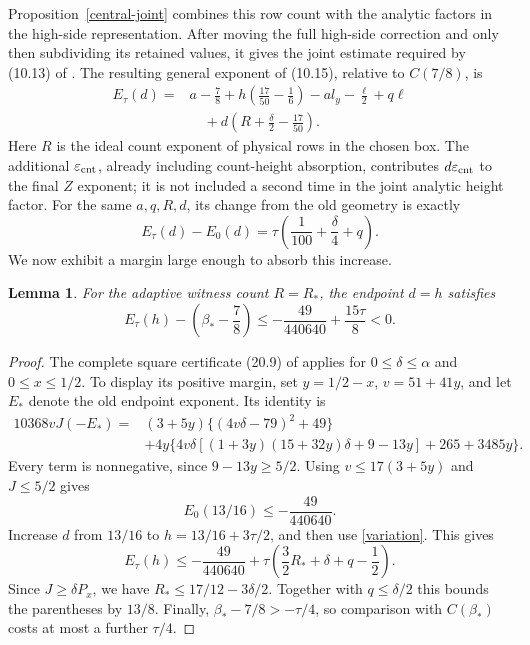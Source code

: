 \documentclass[10pt,reqno,a4paper]{amsart}
\newtheorem{lemma}[theorem]{Lemma}
\theoremstyle{remark}
\newcommand{\eps}{\varepsilon}
\newcommand{\bp}{\beta_*}
\begin{document}
Proposition~\ref{central-joint} combines this row count with the
analytic factors in the high-side representation. After moving the full high-side
correction and only then subdividing its retained values, it gives
the joint estimate required by (10.13) of \cite{q30}. The resulting
general exponent of (10.15), relative to $C(7/8)$, is
\begin{equation}\label{high-exponent}
\begin{aligned}
 E_\tau(d)={}&a-\frac78
       +h\left(\frac{17}{50}-\frac16\right)
       -al_y-\frac\ell2+q\ell\\
      &\quad+d\left(R+\frac\delta2-\frac{17}{50}\right).
\end{aligned}
\end{equation}
Here $R$ is the ideal count exponent of physical rows in the chosen
box. The additional $\eps_{\rm cnt}$, already including count-height
absorption, contributes $d\eps_{\rm cnt}$ to the final $Z$ exponent;
it is not included a second time in the joint analytic height factor.
For the same $a,q,R,d$, its change from the old geometry is exactly
\begin{equation}\label{variation}
       E_\tau(d)-E_0(d)
         =\tau\left(\frac1{100}+\frac\delta4+q\right).
\end{equation}
We now exhibit a margin large enough to absorb this increase.

\begin{lemma}\label{endpoint}
For the adaptive witness count $R=R_*$, the endpoint $d=h$ satisfies
\[
 E_\tau(h)-\left(\bp-\frac78\right)
          \le-\frac{49}{440640}+\frac{15\tau}{8}<0.
\]
\end{lemma}

\begin{proof}
The complete square certificate (20.9) of \cite{q30} applies for
$0\le\delta\le\alpha$ and $0\le x\le1/2$. To display its positive
margin, set $y=1/2-x$, $v=51+41y$, and let $E_*$ denote the old
endpoint exponent. Its identity is
\begin{align*}
 10368vJ(-E_*)={}&(3+5y)\bigl\{(4v\delta-79)^2+49\bigr\}\\
 &+4y\bigl\{4v\delta[
       (1+3y)(15+32y)\delta+9-13y]+265+3485y\bigr\}.
\end{align*}
Every term is nonnegative, since $9-13y\ge5/2$. Using
$v\le17(3+5y)$ and $J\le5/2$ gives
\[
                         E_0(13/16)\le-\frac{49}{440640}.
\]
Increase $d$ from $13/16$ to $h=13/16+3\tau/2$, and then use
\eqref{variation}. This gives
\[
 E_\tau(h)\le-\frac{49}{440640}
       +\tau\left(\frac32R_*+\delta+q-\frac12\right).
\]
Since $J\ge\delta P_x$, we have
$R_*\le17/12-3\delta/2$. Together with $q\le\delta/2$ this bounds
the parentheses by $13/8$. Finally,
$\bp-7/8>-\tau/4$, so comparison with $C(\bp)$ costs at most a
further $\tau/4$.
\end{proof}
\end{document}
